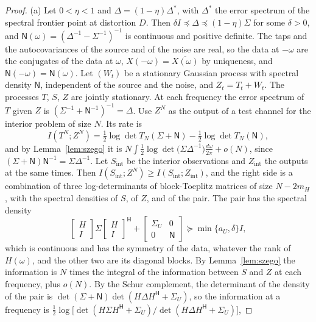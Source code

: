 \documentclass[11pt,onecolumn]{IEEEtran}
\newcommand{\dw}{\tfrac{d\omega}{2\pi}}
\newcommand{\herm}{\mathsf H}
\begin{document}
\begin{proof}
(a) Let $0<\eta<1$ and $\Delta=(1-\eta)\Delta^\ast$, with $\Delta^\ast$
the error spectrum of the spectral frontier point at distortion $D$.
Then $\delta I\preceq\Delta\preceq(1-\eta)\Sigma$ for some $\delta>0$, and
$\mathsf N(\omega)=(\Delta^{-1}-\Sigma^{-1})^{-1}$ is continuous and
positive definite. The taps and the autocovariances of the source and
of the noise are real, so the
data at $-\omega$ are the conjugates of the data at $\omega$,
$X(-\omega)=\overline{X(\omega)}$ by uniqueness, and
$\mathsf N(-\omega)=\overline{\mathsf N(\omega)}$.
Let $(W_t)$ be a stationary Gaussian process with spectral density
$\mathsf N$, independent of the source and the noise, and $Z_t=T_t+W_t$.
The processes $T$, $S$, $Z$ are jointly stationary. At each frequency
the error spectrum of $T$ given $Z$ is
$(\Sigma^{-1}+\mathsf N^{-1})^{-1}=\Delta$. Use $Z^N$ as the output of a
test channel for the interior problem of size $N$. Its rate is
\[
I(T^N;Z^N)=\tfrac12\log\det T_N(\Sigma+\mathsf N)-\tfrac12\log\det T_N(\mathsf N),
\]
and by Lemma~\ref{lem:szego} it is
$N\int\tfrac12\log\det\bigl(\Sigma\Delta^{-1}\bigr)\dw+o(N)$, since
$(\Sigma+\mathsf N)\mathsf N^{-1}=\Sigma\Delta^{-1}$. Let $S_{\mathrm{int}}$
be the interior observations and $Z_{\mathrm{int}}$ the outputs at the
same times. Then
$I(S_{\mathrm{int}};Z^N)\ge I(S_{\mathrm{int}};Z_{\mathrm{int}})$, and the
right side is a combination of three log-determinants of
block-Toeplitz matrices of size $N-2m_H$, with the spectral densities
of $S$, of $Z$, and of the pair. The pair has the spectral density
\[
\begin{bmatrix}H\\I\end{bmatrix}\Sigma\begin{bmatrix}H\\I\end{bmatrix}^{\herm}
+\begin{bmatrix}\Sigma_U&0\\0&\mathsf N\end{bmatrix}\succeq\min\{a_U,\delta\}I ,
\]
which is continuous and has the symmetry of the data, whatever the rank
of $H(\omega)$, and the other two are its diagonal blocks. By
Lemma~\ref{lem:szego} the information is $N$ times the integral of the
information between $S$ and $Z$ at each frequency, plus $o(N)$. By the
Schur complement, the determinant of the density of the pair is
$\det(\Sigma+\mathsf N)\det(H\Delta H^{\herm}+\Sigma_U)$, so the
information at a frequency is
$\tfrac12\log\bigl[\det(H\Sigma H^{\herm}+\Sigma_U)/\det(H\Delta H^{\herm}+\Sigma_U)\bigr]$,

\end{proof}
\end{document}
